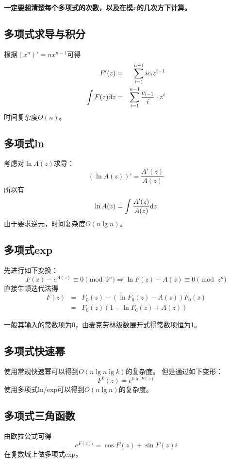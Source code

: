{\bfseries 一定要想清楚每个多项式的次数，以及在模$x$的几次方下计算。}
\subsection{多项式求导与积分}
根据$(x^n)'=nx^{n-1}$可得
\begin{eqnarray*}
    F'(z)&=&\sum_{i=1}^{n-1}{ic_iz^{i-1}}\\
    \int F(z)\textrm{d} z&=&\sum_{i=1}^{n-1}{\frac{c_{i-1}}{i}\cdot z^i}
\end{eqnarray*}
时间复杂度$O(n)$。
\subsection{多项式ln}
考虑对$\ln A(z)$求导：
\begin{displaymath}
    (\ln A(z))'=\frac{A'(z)}{A(z)}
\end{displaymath}
所以有
\begin{displaymath}
    \ln A(z)=\int \frac{A'(z)}{A(z)}\textrm{d} z
\end{displaymath}
由于要求逆元，时间复杂度$O(n \lg n)$。
\subsection{多项式exp}
先进行如下变换：
\begin{displaymath}
    F(z)-e^{A(z)}\equiv 0 \pmod{z^n}
    \Rightarrow \ln F(z)-A(z)\equiv 0 \pmod{z^n}
\end{displaymath}
直接牛顿迭代法得
\begin{eqnarray*}
    F(z)&=&F_0(z)-(\ln F_0(z)-A(z))F_0(z)\\
    &=&F_0(z)(1-\ln F_0(z)+A(z))
\end{eqnarray*}

一般其输入的常数项为0，由麦克劳林级数展开式得常数项恒为1。
\subsection{多项式快速幂}
使用常规快速幂可以得到$O(n\lg n\lg k)$的复杂度。
但是通过如下变形：
\begin{displaymath}
    F^k(z)=e^{k \ln F(z)}
\end{displaymath}
使用多项式ln/exp可以得到$O(n\lg n)$的复杂度。
\subsection{多项式三角函数}
由欧拉公式可得
\begin{displaymath}
    e^{F(z)i}=\cos F(z)+\sin F(z) i
\end{displaymath}
在复数域上做多项式exp。

